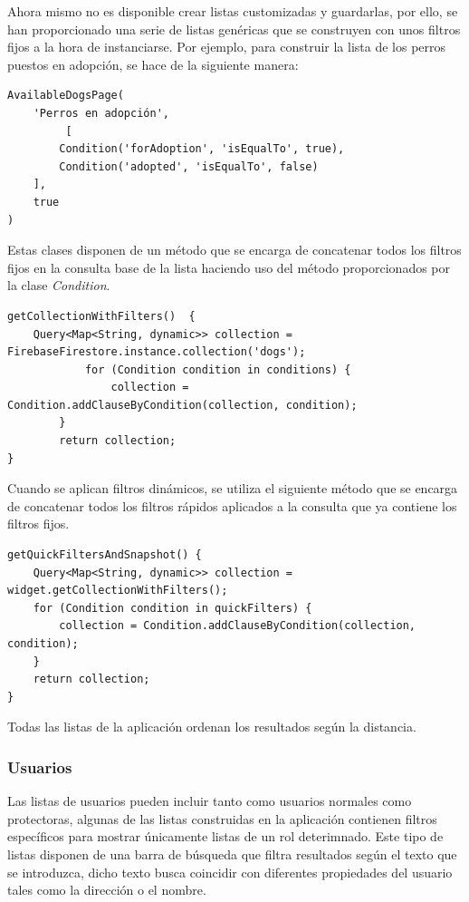 \documentclass[a4paper, 12pt]{article}
\begin{document}
Ahora mismo no es disponible crear listas customizadas y guardarlas, por ello, se han proporcionado una serie de listas genéricas que se construyen con unos filtros fijos a la hora de instanciarse. Por ejemplo, para construir la lista de los perros puestos en adopción, se hace de la siguiente manera:

\begin{verbatim}
AvailableDogsPage(
	'Perros en adopción',
         [
		Condition('forAdoption', 'isEqualTo', true), 
		Condition('adopted', 'isEqualTo', false)
	], 
	true
)
\end{verbatim}


Estas clases disponen de un método que se encarga de concatenar todos los filtros fijos en la consulta base de la lista haciendo uso del método proporcionados por la clase \textit{Condition}.

\begin{verbatim}
getCollectionWithFilters()  {
	Query<Map<String, dynamic>> collection = FirebaseFirestore.instance.collection('dogs');
    		for (Condition condition in conditions) {
      			collection = Condition.addClauseByCondition(collection, condition);
   		}
    	return collection;
}
\end{verbatim}

Cuando se aplican filtros dinámicos, se utiliza el siguiente método que se encarga de concatenar todos los filtros rápidos aplicados a la consulta que ya contiene los filtros fijos.

\begin{verbatim}
getQuickFiltersAndSnapshot() {
    Query<Map<String, dynamic>> collection = widget.getCollectionWithFilters();
    for (Condition condition in quickFilters) {
        collection = Condition.addClauseByCondition(collection, condition);
    }
    return collection;
}
\end{verbatim}

Todas las listas de la aplicación ordenan los resultados según la distancia.

\newpage
\subsubsection*{Usuarios}

Las listas de usuarios pueden incluir tanto como usuarios normales como protectoras, algunas de las listas construidas en la aplicación contienen filtros específicos para mostrar únicamente listas de un rol deterimnado. Este tipo de listas disponen de una barra de búsqueda que filtra resultados según el texto que se introduzca, dicho texto busca coincidir con diferentes propiedades del usuario tales como la dirección o el nombre. 
\end{document}
